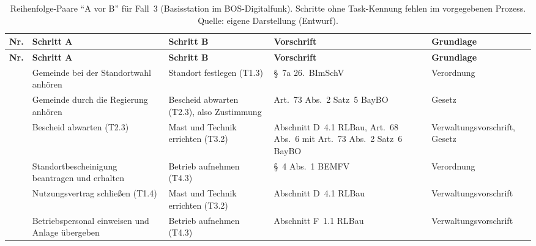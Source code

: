 \begin{small}
\begin{longtable}{@{}>{\raggedright\arraybackslash}p{0.7cm}>{\raggedright\arraybackslash}p{4.2cm}>{\raggedright\arraybackslash}p{4.2cm}>{\raggedright\arraybackslash}p{3.4cm}>{\raggedright\arraybackslash}p{1.9cm}@{}}
\caption[Reihenfolge-Paare für Fall~3]{Reihenfolge-Paare \enquote{A vor B} für Fall~3 (Basisstation im BOS-Digitalfunk). Schritte ohne Task-Kennung fehlen im vorgegebenen Prozess. Quelle: eigene Darstellung (Entwurf).}\label{tab:h4_paare_fall3}\\
\toprule \textbf{Nr.} & \textbf{Schritt A} & \textbf{Schritt B} & \textbf{Vorschrift} & \textbf{Grundlage} \\ \midrule \endfirsthead
\toprule \textbf{Nr.} & \textbf{Schritt A} & \textbf{Schritt B} & \textbf{Vorschrift} & \textbf{Grundlage} \\ \midrule \endhead
\bottomrule \endfoot
1 & Gemeinde bei der Standortwahl anhören & Standort festlegen (T1.3) & §~7a 26.~BImSchV & Verordnung \\
2 & Gemeinde durch die Regierung anhören & Bescheid abwarten (T2.3), also Zustimmung & Art.~73 Abs.~2 Satz~5 BayBO & Gesetz \\
3 & Bescheid abwarten (T2.3) & Mast und Technik errichten (T3.2) & Abschnitt D~4.1 RLBau, Art.~68 Abs.~6 mit Art.~73 Abs.~2 Satz~6 BayBO & Verwaltungsvorschrift, Gesetz \\
4 & Standortbescheinigung beantragen und erhalten & Betrieb aufnehmen (T4.3) & §~4 Abs.~1 BEMFV & Verordnung \\
5 & Nutzungsvertrag schließen (T1.4) & Mast und Technik errichten (T3.2) & Abschnitt D~4.1 RLBau & Verwaltungsvorschrift \\
6 & Betriebspersonal einweisen und Anlage übergeben & Betrieb aufnehmen (T4.3) & Abschnitt F~1.1 RLBau & Verwaltungsvorschrift \\
\end{longtable}
\end{small}

